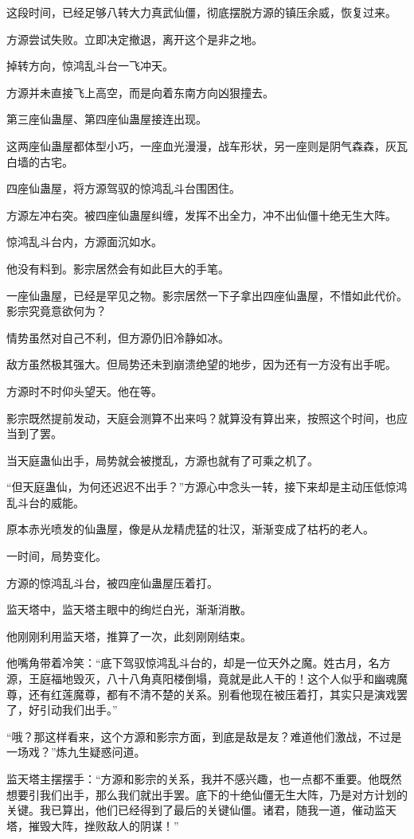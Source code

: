 \begin{this_body}
这段时间，已经足够八转大力真武仙僵，彻底摆脱方源的镇压余威，恢复过来。

方源尝试失败。立即决定撤退，离开这个是非之地。

掉转方向，惊鸿乱斗台一飞冲天。

方源并未直接飞上高空，而是向着东南方向凶狠撞去。

第三座仙蛊屋、第四座仙蛊屋接连出现。

这两座仙蛊屋都体型小巧，一座血光漫漫，战车形状，另一座则是阴气森森，灰瓦白墙的古宅。

四座仙蛊屋，将方源驾驭的惊鸿乱斗台围困住。

方源左冲右突。被四座仙蛊屋纠缠，发挥不出全力，冲不出仙僵十绝无生大阵。

惊鸿乱斗台内，方源面沉如水。

他没有料到。影宗居然会有如此巨大的手笔。

一座仙蛊屋，已经是罕见之物。影宗居然一下子拿出四座仙蛊屋，不惜如此代价。影宗究竟意欲何为？

情势虽然对自己不利，但方源仍旧冷静如冰。

敌方虽然极其强大。但局势还未到崩溃绝望的地步，因为还有一方没有出手呢。

方源时不时仰头望天。他在等。

影宗既然提前发动，天庭会测算不出来吗？就算没有算出来，按照这个时间，也应当到了罢。

当天庭蛊仙出手，局势就会被搅乱，方源也就有了可乘之机了。

“但天庭蛊仙，为何还迟迟不出手？”方源心中念头一转，接下来却是主动压低惊鸿乱斗台的威能。

原本赤光喷发的仙蛊屋，像是从龙精虎猛的壮汉，渐渐变成了枯朽的老人。

一时间，局势变化。

方源的惊鸿乱斗台，被四座仙蛊屋压着打。

监天塔中，监天塔主眼中的绚烂白光，渐渐消散。

他刚刚利用监天塔，推算了一次，此刻刚刚结束。

他嘴角带着冷笑：“底下驾驭惊鸿乱斗台的，却是一位天外之魔。姓古月，名方源，王庭福地毁灭，八十八角真阳楼倒塌，竟就是此人干的！这个人似乎和幽魂魔尊，还有红莲魔尊，都有不清不楚的关系。别看他现在被压着打，其实只是演戏罢了，好引动我们出手。”

“哦？那这样看来，这个方源和影宗方面，到底是敌是友？难道他们激战，不过是一场戏？”炼九生疑惑问道。

监天塔主摆摆手：“方源和影宗的关系，我并不感兴趣，也一点都不重要。他既然想要引我们出手，那么我们就出手罢。底下的十绝仙僵无生大阵，乃是对方计划的关键。我已算出，他们已经得到了最后的关键仙僵。诸君，随我一道，催动监天塔，摧毁大阵，挫败敌人的阴谋！”


\end{this_body}

